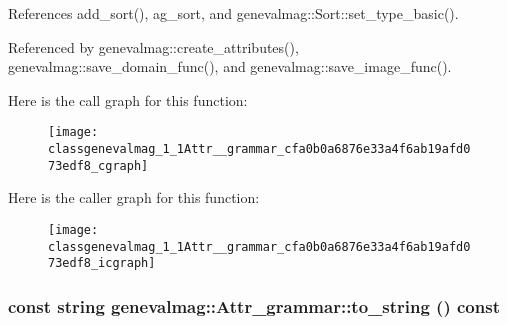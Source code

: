 References add\_\-sort(), ag\_\-sort, and genevalmag::Sort::set\_\-type\_\-basic().

Referenced by genevalmag::create\_\-attributes(), genevalmag::save\_\-domain\_\-func(), and genevalmag::save\_\-image\_\-func().

Here is the call graph for this function:\nopagebreak
\begin{figure}[H]
\begin{center}
\leavevmode
\texttt{[image: classgenevalmag\_1\_1Attr\_\_grammar\_cfa0b0a6876e33a4f6ab19afd073edf8\_cgraph]}
\end{center}
\end{figure}


Here is the caller graph for this function:\nopagebreak
\begin{figure}[H]
\begin{center}
\leavevmode
\texttt{[image: classgenevalmag\_1\_1Attr\_\_grammar\_cfa0b0a6876e33a4f6ab19afd073edf8\_icgraph]}
\end{center}
\end{figure}
\hypertarget{classgenevalmag_1_1Attr__grammar_d2f2da693afe958a6dc84078c391100e}{
\subsubsection[{to\_\-string}]{\setlength{\rightskip}{0pt plus 5cm}const string genevalmag::Attr\_\-grammar::to\_\-string () const}}
\label{classgenevalmag_1_1Attr__grammar_d2f2da693afe958a6dc84078c391100e}


